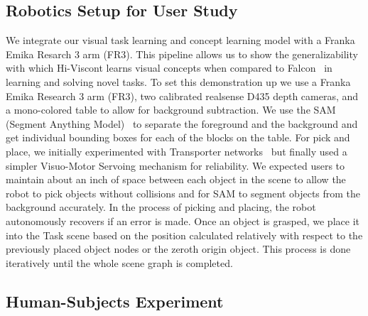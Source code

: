 \subsection{Robotics Setup for User Study}
We integrate our visual task learning and concept learning model with a Franka Emika Resarch 3 arm (FR3). 
This pipeline allows us to show the generalizability with which Hi-Viscont learns visual concepts when compared to Falcon~\cite{mei2022falcon} in learning and solving novel tasks. 
To set this demonstration up we use a Franka Emika Research 3 arm (FR3), two calibrated realsense D435 depth cameras, and a mono-colored table to allow for background subtraction. We use the SAM (Segment Anything Model)~\cite{kirillov2023segment} to separate the foreground and the background and get individual bounding boxes for each of the blocks on the table. 
For pick and place, we initially experimented with Transporter networks~\cite{zeng2021transporter}
but finally used a simpler Visuo-Motor Servoing mechanism for reliability.
We expected users to maintain about an inch of space between each object in the scene to allow the robot to pick objects without collisions and for SAM to segment objects from the background accurately.
In the process of picking and placing, the robot autonomously recovers if an error is made.
Once an object is grasped, we place it into the Task scene based on the position calculated relatively  with respect to the previously placed object nodes or the zeroth origin object. This process is done iteratively until the whole scene graph is completed.


\subsection{Human-Subjects Experiment}
